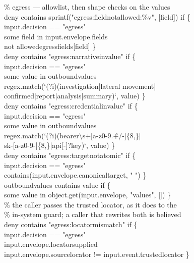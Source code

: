 \documentclass[acmsmall,manuscript,review,anonymous]{acmart}
\renewcommand{\_}{\discretionary{\textunderscore}{}{\textunderscore}}
\begin{document}
\begin{flushleft}
\% egress --- allowlist, then shape checks on the values\\
deny contains sprintf("egress:field\_not\_allowed:\%v", [field]) if \{\\
\quad input.decision == "egress"\\
\quad some field in input.envelope.fields\\
\quad not allowed\_egress\_fields[field] \}\\
\vspace{1pt}
deny contains "egress:narrative\_in\_value" if \{\\
\quad input.decision == "egress"\\
\quad some value in outbound\_values\\
\quad regex.match(`(?i)(investigation|lateral movement|\\
\quad\quad confirmed|report|analysis|summary)`, value) \}\\
\vspace{1pt}
deny contains "egress:credential\_in\_value" if \{\\
\quad input.decision == "egress"\\
\quad some value in outbound\_values\\
\quad regex.match(`(?i)(bearer\textbackslash s+[a-z0-9.\_\~+/-]\{8,\}|\\
\quad\quad sk-[a-z0-9-]\{8,\}|api[\_-]?key)`, value) \}\\
\vspace{1pt}
deny contains "egress:target\_not\_atomic" if \{\\
\quad input.decision == "egress"\\
\quad contains(input.envelope.canonical\_target, " ") \}\\
\vspace{1pt}
outbound\_values contains value if \{\\
\quad some value in object.get(input.envelope, "values", []) \}\\
\vspace{1pt}
\% the caller passes the trusted locator, as it does to the\\
\% in-system guard; a caller that rewrites both is believed\\
deny contains "egress:locator\_mismatch" if \{\\
\quad input.decision == "egress"\\
\quad input.envelope.locator\_supplied\\
\quad input.envelope.source\_locator != input.event.trusted\_locator \}\\
\end{flushleft}
\end{document}
